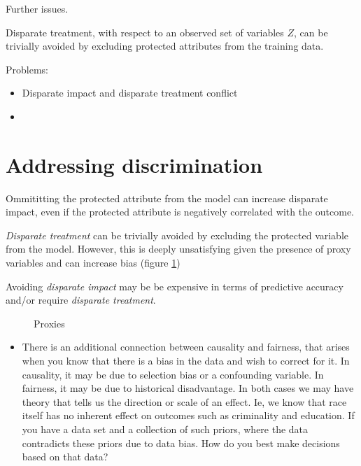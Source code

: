 \documentclass[11pt,a4paper,oneside]{book}
\theoremstyle{plain}
\theoremstyle{definition}
\begin{document}
Further issues.


Disparate treatment, with respect to an observed set of variables $Z$, can be trivially avoided by excluding protected attributes from the training data. 

Problems:
\begin{itemize}
\item Disparate impact and disparate treatment conflict
\item 
\end{itemize}



\section{Addressing discrimination}

Ommititting the protected attribute from the model can increase disparate impact, even if the protected attribute is negatively correlated with the outcome. 


\textit{Disparate treatment} can be trivially avoided by excluding the protected variable from the model. However, this is deeply unsatisfying given the presence of proxy variables and can increase bias (figure \ref{fig:recidivism})

Avoiding \textit{disparate impact} may be be expensive in terms of predictive accuracy and/or require \textit{disparate treatment}. 

\begin{figure}[H]
\caption{Proxies}
\label{fig:recidivism}
	\centering    
\end{figure}


\begin{itemize}
\item There is an additional connection between causality and fairness, that arises when you know that there is a bias in the data and wish to correct for it. In causality, it may be due to selection bias or a confounding variable. In fairness, it may be due to historical disadvantage. In both cases we may have theory that tells us the direction or scale of an effect. Ie, we know that race itself has no inherent effect on outcomes such as criminality and education. If you have a data set and a collection of such priors, where the data contradicts these priors due to data bias. How do you best make decisions based on that data? 
\end{itemize}
\end{document}

